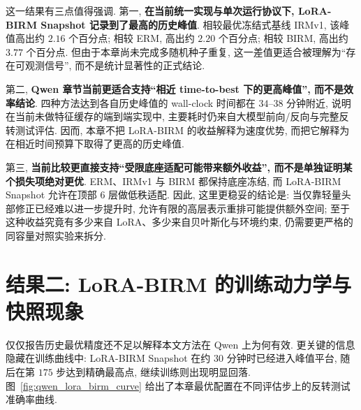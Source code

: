 \documentclass[a4paper,punct=banjiao,twoside]{ctexrep}
\theoremstyle{plain}
\theoremstyle{definition}
\theoremstyle{remark}
\begin{document}
\begin{table}[htbp]
    \centering
    \caption{Qwen 平台上四种算法的历史峰值结果对比.}
    \label{tab:qwen_four_way_compare}
\end{table}

这一结果有三点值得强调. 第一, \textbf{在当前统一实现与单次运行协议下, LoRA-BIRM Snapshot 记录到了最高的历史峰值}. 相较最优冻结式基线 IRMv1, 该峰值高出约 $2.16$ 个百分点; 相较 ERM, 高出约 $2.20$ 个百分点; 相较 BIRM, 高出约 $3.77$ 个百分点. 但由于本章尚未完成多随机种子重复, 这一差值更适合被理解为“存在可观测信号”, 而不是统计显著性的正式结论.

第二, \textbf{Qwen 章节当前更适合支持“相近 time-to-best 下的更高峰值”, 而不是效率结论}. 四种方法达到各自历史峰值的 wall-clock 时间都在 $34$--$38$ 分钟附近, 说明在当前未做特征缓存的端到端实现中, 主要耗时仍来自大模型前向/反向与完整反转测试评估. 因而, 本章不把 LoRA-BIRM 的收益解释为速度优势, 而把它解释为在相近时间预算下取得了更高的历史峰值.

第三, \textbf{当前比较更直接支持“受限底座适配可能带来额外收益”, 而不是单独证明某个损失项绝对更优}. ERM、IRMv1 与 BIRM 都保持底座冻结, 而 LoRA-BIRM Snapshot 允许在顶部 $6$ 层做低秩适配. 因此, 这里更稳妥的结论是: 当仅靠轻量头部修正已经难以进一步提升时, 允许有限的高层表示重排可能提供额外空间; 至于这种收益究竟有多少来自 LoRA、多少来自贝叶斯化与环境约束, 仍需要更严格的同容量对照实验来拆分.

\section{结果二: LoRA-BIRM 的训练动力学与快照现象}

仅仅报告历史最优精度还不足以解释本文方法在 Qwen 上为何有效. 更关键的信息隐藏在训练曲线中: LoRA-BIRM Snapshot 在约 $30$ 分钟时已经进入峰值平台, 随后在第 $175$ 步达到精确最高点, 继续训练则出现明显回落. 图~\ref{fig:qwen_lora_birm_curve} 给出了本章最优配置在不同评估步上的反转测试准确率曲线.
\end{document}
